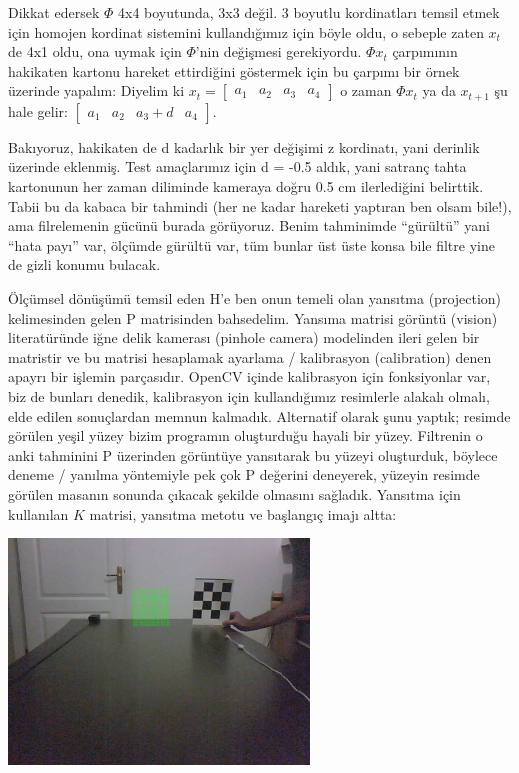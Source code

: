 \documentclass[12pt,fleqn]{article}\usepackage{../../common}
\begin{document}
Dikkat edersek $\Phi$ 4x4 boyutunda, 3x3 değil. 3 boyutlu kordinatları temsil
etmek için homojen kordinat sistemini kullandığımız için böyle oldu, o sebeple
zaten $x_t$ de 4x1 oldu, ona uymak için $\Phi$'nin değişmesi gerekiyordu. $\Phi
x_t$ çarpımının hakikaten kartonu hareket ettirdiğini göstermek için bu çarpımı
bir örnek üzerinde yapalım: Diyelim ki $x_t =
\left[\begin{array}{cccc}a_1&a_2&a_3&a_4\end{array}\right]$ o zaman $\Phi x_t$
ya da $x_{t+1}$ şu hale gelir:
$\left[\begin{array}{cccc}a_1&a_2&a_3+d&a_4\end{array}\right]$.


Bakıyoruz, hakikaten de d kadarlık bir yer değişimi z kordinatı, yani
derinlik üzerinde eklenmiş. Test amaçlarımız için d = -0.5 aldık, yani
satranç tahta kartonunun her zaman diliminde kameraya doğru 0.5 cm
ilerlediğini belirttik. Tabii bu da kabaca bir tahmindi (her ne kadar
hareketi yaptıran ben olsam bile!), ama filrelemenin gücünü burada
görüyoruz. Benim tahminimde ``gürültü'' yani ``hata payı'' var, ölçümde
gürültü var, tüm bunlar üst üste konsa bile filtre yine de gizli konumu
bulacak.

Ölçümsel dönüşümü temsil eden H'e ben onun temeli olan yansıtma
(projection) kelimesinden gelen P matrisinden bahsedelim. Yansıma matrisi
görüntü (vision) literatüründe iğne delik kamerası (pinhole camera)
modelinden ileri gelen bir matristir ve bu matrisi hesaplamak ayarlama /
kalibrasyon (calibration) denen apayrı bir işlemin parçasıdır. OpenCV
içinde kalibrasyon için fonksiyonlar var, biz de bunları denedik,
kalibrasyon için kullandığımız resimlerle alakalı olmalı, elde edilen
sonuçlardan memnun kalmadık. Alternatif olarak şunu yaptık; resimde görülen
yeşil yüzey bizim programın oluşturduğu hayali bir yüzey. Filtrenin o anki
tahminini P üzerinden görüntüye yansıtarak bu yüzeyi oluşturduk, böylece
deneme / yanılma yöntemiyle pek çok P değerini deneyerek, yüzeyin resimde
görülen masanın sonunda çıkacak şekilde olmasını sağladık. Yansıtma için
kullanılan $K$ matrisi, yansıtma metotu ve başlangıç imajı altta:

\includegraphics[height=6cm]{vision_60track_01.jpg}
\end{document}
